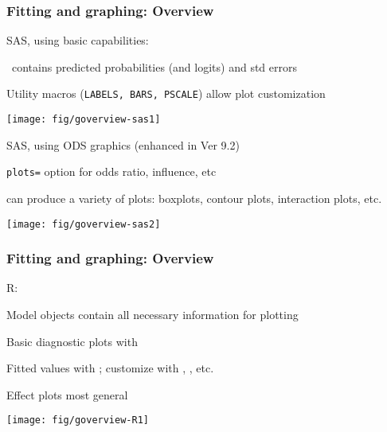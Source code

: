 \begin{frame}
  \frametitle{Fitting and graphing: Overview}
  SAS, using basic capabilities:
  \begin{itemize*}
  	\item \ODS\ contains predicted probabilities (and logits) and std errors
	\item Utility macros (\texttt{LABELS, BARS, PSCALE}) allow plot customization
  \end{itemize*}
  \begin{center}
  	\texttt{[image: fig/goverview-sas1]}
  \end{center}
  SAS, using ODS graphics (enhanced in Ver 9.2)
  \begin{itemize*}
    \item \texttt{plots=} option for odds ratio, influence, etc
  	\item {} can produce a variety of plots: boxplots, contour plots, interaction plots, etc.
  \end{itemize*}
  \begin{center}
  	\texttt{[image: fig/goverview-sas2]}
  \end{center}
\end{frame}

\begin{frame}
  \frametitle{Fitting and graphing: Overview}
  R:
  \begin{itemize*}
  	\item Model objects contain all necessary information for plotting
	\item Basic diagnostic plots with 
	\item Fitted values with ; customize with , , etc.
	\item Effect plots most general  
  \end{itemize*}
  \begin{center}
  	\texttt{[image: fig/goverview-R1]}
  \end{center}
\end{frame}

